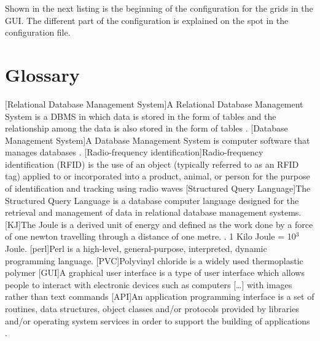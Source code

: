 \documentclass[a4paper,10pt,twoside,headings=small,bibliography=totocnumbered,headsepline]{scrartcl}
\begin{document}
\begin{appendix}
Shown in the next listing is the beginning of the configuration for the grids in the GUI. The different part of the configuration is explained on the spot in the configuration file.



\newpage

\section{Glossary}
\begin{acronym}
[Relational Database Management System]{A Relational Database Management System is a \acs{DBMS} in which data is stored in the form of tables and the relationship among the data is also stored in the form of tables \cite{wiki:rdbms}.}
[Database Management System]{A Database Management System is computer software that manages databases \cite{wiki:dbms}.}
[Radio-frequency identification]{Radio-frequency identification (RFID) is the use of an object (typically referred to as an RFID tag) applied to or incorporated into a product, animal, or person for the purpose of identification and tracking using radio waves \cite{wiki:rfid}}
[Structured Query Language]{The Structured Query Language is a database computer language designed for the retrieval and management of data in relational database management systems.\cite{wiki:sql}}
[KJ]{The Joule is a derived unit of energy and defined as the work done by a force of one newton travelling through a distance of one metre. \cite{wiki:joule}. 1 Kilo Joule = 10$^3$ Joule.}
[perl]{Perl is a high-level, general-purpose, interpreted, dynamic programming language. \cite{wiki:perl}}
[PVC]{Polyvinyl chloride is a widely used thermoplastic polymer \cite{wiki:pvc}}
[GUI]{A graphical user interface is a type of user interface which allows people to interact with electronic devices such as computers [\ldots] with images rather than text commands \cite{wiki:gui}}
[API]{An application programming interface is a set of routines, data structures, object classes and/or protocols provided by libraries and/or operating system services in order to support the building of applications \cite{wiki:api}.}

\end{acronym}
\end{appendix}
\end{document}
